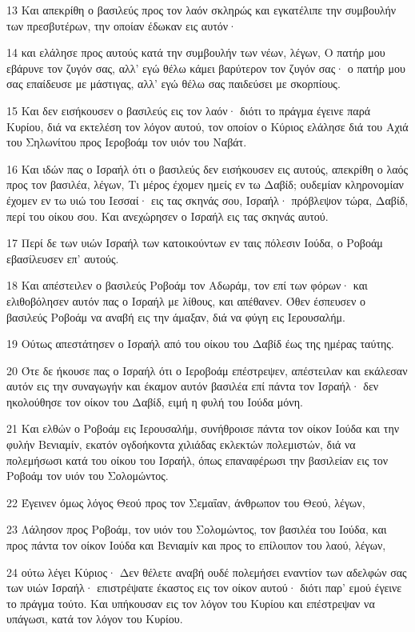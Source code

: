 \par 13 Και απεκρίθη ο βασιλεύς προς τον λαόν σκληρώς και εγκατέλιπε την συμβουλήν των πρεσβυτέρων, την οποίαν έδωκαν εις αυτόν·
\par 14 και ελάλησε προς αυτούς κατά την συμβουλήν των νέων, λέγων, Ο πατήρ μου εβάρυνε τον ζυγόν σας, αλλ' εγώ θέλω κάμει βαρύτερον τον ζυγόν σας· ο πατήρ μου σας επαίδευσε με μάστιγας, αλλ' εγώ θέλω σας παιδεύσει με σκορπίους.
\par 15 Και δεν εισήκουσεν ο βασιλεύς εις τον λαόν· διότι το πράγμα έγεινε παρά Κυρίου, διά να εκτελέση τον λόγον αυτού, τον οποίον ο Κύριος ελάλησε διά του Αχιά του Σηλωνίτου προς Ιεροβοάμ τον υιόν του Ναβάτ.
\par 16 Και ιδών πας ο Ισραήλ ότι ο βασιλεύς δεν εισήκουσεν εις αυτούς, απεκρίθη ο λαός προς τον βασιλέα, λέγων, Τι μέρος έχομεν ημείς εν τω Δαβίδ; ουδεμίαν κληρονομίαν έχομεν εν τω υιώ του Ιεσσαί· εις τας σκηνάς σου, Ισραήλ· πρόβλεψον τώρα, Δαβίδ, περί του οίκου σου. Και ανεχώρησεν ο Ισραήλ εις τας σκηνάς αυτού.
\par 17 Περί δε των υιών Ισραήλ των κατοικούντων εν ταις πόλεσιν Ιούδα, ο Ροβοάμ εβασίλευσεν επ' αυτούς.
\par 18 Και απέστειλεν ο βασιλεύς Ροβοάμ τον Αδωράμ, τον επί των φόρων· και ελιθοβόλησεν αυτόν πας ο Ισραήλ με λίθους, και απέθανεν. Όθεν έσπευσεν ο βασιλεύς Ροβοάμ να αναβή εις την άμαξαν, διά να φύγη εις Ιερουσαλήμ.
\par 19 Ούτως απεστάτησεν ο Ισραήλ από του οίκου του Δαβίδ έως της ημέρας ταύτης.
\par 20 Ότε δε ήκουσε πας ο Ισραήλ ότι ο Ιεροβοάμ επέστρεψεν, απέστειλαν και εκάλεσαν αυτόν εις την συναγωγήν και έκαμον αυτόν βασιλέα επί πάντα τον Ισραήλ· δεν ηκολούθησε τον οίκον του Δαβίδ, ειμή η φυλή του Ιούδα μόνη.
\par 21 Και ελθών ο Ροβοάμ εις Ιερουσαλήμ, συνήθροισε πάντα τον οίκον Ιούδα και την φυλήν Βενιαμίν, εκατόν ογδοήκοντα χιλιάδας εκλεκτών πολεμιστών, διά να πολεμήσωσι κατά του οίκου του Ισραήλ, όπως επαναφέρωσι την βασιλείαν εις τον Ροβοάμ τον υιόν του Σολομώντος.
\par 22 Έγεινεν όμως λόγος Θεού προς τον Σεμαΐαν, άνθρωπον του Θεού, λέγων,
\par 23 Λάλησον προς Ροβοάμ, τον υιόν του Σολομώντος, τον βασιλέα του Ιούδα, και προς πάντα τον οίκον Ιούδα και Βενιαμίν και προς το επίλοιπον του λαού, λέγων,
\par 24 ούτω λέγει Κύριος· Δεν θέλετε αναβή ουδέ πολεμήσει εναντίον των αδελφών σας των υιών Ισραήλ· επιστρέψατε έκαστος εις τον οίκον αυτού· διότι παρ' εμού έγεινε το πράγμα τούτο. Και υπήκουσαν εις τον λόγον του Κυρίου και επέστρεψαν να υπάγωσι, κατά τον λόγον του Κυρίου.
